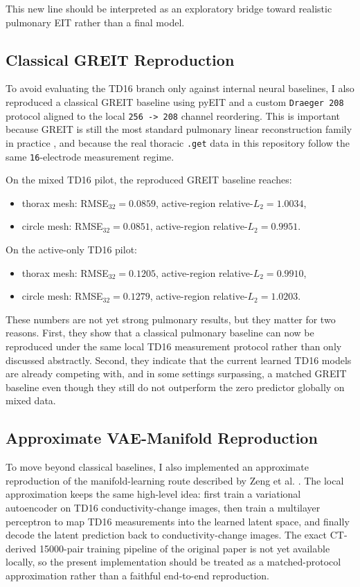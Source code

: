 \documentclass[11pt,a4paper]{article}
\begin{document}
This new line should be interpreted as an exploratory bridge toward realistic
pulmonary EIT rather than a final model.

\subsection{Classical GREIT Reproduction}
To avoid evaluating the TD16 branch only against internal neural baselines, I
also reproduced a classical GREIT baseline using pyEIT \cite{liu2018pyeit} and
a custom \texttt{Draeger 208} protocol aligned to the local
\texttt{256 -> 208} channel reordering. This is important because GREIT is
still the most standard pulmonary linear reconstruction family in practice
\cite{adler2009greit}, and because the real thoracic \texttt{.get} data in this
repository follow the same \texttt{16}-electrode measurement regime.

On the mixed TD16 pilot, the reproduced GREIT baseline reaches:
\begin{itemize}[leftmargin=1.5em]
    \item thorax mesh: RMSE$_{32} = 0.0859$, active-region relative-$L_2 = 1.0034$,
    \item circle mesh: RMSE$_{32} = 0.0851$, active-region relative-$L_2 = 0.9951$.
\end{itemize}

On the active-only TD16 pilot:
\begin{itemize}[leftmargin=1.5em]
    \item thorax mesh: RMSE$_{32} = 0.1205$, active-region relative-$L_2 = 0.9910$,
    \item circle mesh: RMSE$_{32} = 0.1279$, active-region relative-$L_2 = 1.0203$.
\end{itemize}

These numbers are not yet strong pulmonary results, but they matter for two
reasons. First, they show that a classical pulmonary baseline can now be
reproduced under the same local TD16 measurement protocol rather than only
discussed abstractly. Second, they indicate that the current learned TD16
models are already competing with, and in some settings surpassing, a matched
GREIT baseline even though they still do not outperform the zero predictor
globally on mixed data.

\subsection{Approximate VAE-Manifold Reproduction}
To move beyond classical baselines, I also implemented an approximate
reproduction of the manifold-learning route described by Zeng et al.
\cite{zeng2023lungdl}. The local approximation keeps the same high-level idea:
first train a variational autoencoder on TD16 conductivity-change images, then
train a multilayer perceptron to map TD16 measurements into the learned latent
space, and finally decode the latent prediction back to conductivity-change
images. The exact CT-derived 15000-pair training pipeline of the original paper
is not yet available locally, so the present implementation should be treated
as a matched-protocol approximation rather than a faithful end-to-end
reproduction.
\end{document}
